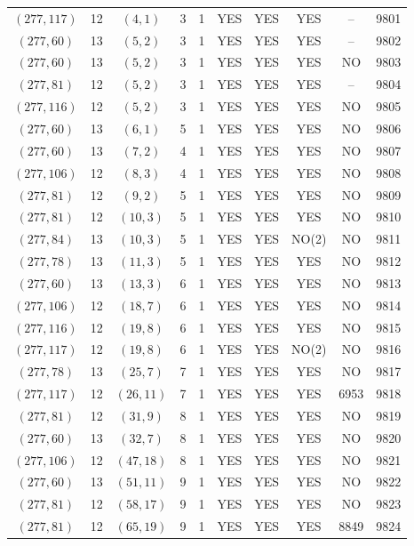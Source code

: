 \begin{longtable}{|c|c|c|c|c|c|c|c|c|c|}
$(277, 117)$ & 12 & $(4, 1)$ & 3 & 1 & YES & YES & YES & -- & 9801\\
$(277, 60)$ & 13 & $(5, 2)$ & 3 & 1 & YES & YES & YES & -- & 9802\\
$(277, 60)$ & 13 & $(5, 2)$ & 3 & 1 & YES & YES & YES & NO & 9803\\
$(277, 81)$ & 12 & $(5, 2)$ & 3 & 1 & YES & YES & YES & -- & 9804\\
$(277, 116)$ & 12 & $(5, 2)$ & 3 & 1 & YES & YES & YES & NO & 9805\\
$(277, 60)$ & 13 & $(6, 1)$ & 5 & 1 & YES & YES & YES & NO & 9806\\
$(277, 60)$ & 13 & $(7, 2)$ & 4 & 1 & YES & YES & YES & NO & 9807\\
$(277, 106)$ & 12 & $(8, 3)$ & 4 & 1 & YES & YES & YES & NO & 9808\\
$(277, 81)$ & 12 & $(9, 2)$ & 5 & 1 & YES & YES & YES & NO & 9809\\
$(277, 81)$ & 12 & $(10, 3)$ & 5 & 1 & YES & YES & YES & NO & 9810\\
$(277, 84)$ & 13 & $(10, 3)$ & 5 & 1 & YES & YES & NO(2) & NO & 9811\\
$(277, 78)$ & 13 & $(11, 3)$ & 5 & 1 & YES & YES & YES & NO & 9812\\
$(277, 60)$ & 13 & $(13, 3)$ & 6 & 1 & YES & YES & YES & NO & 9813\\
$(277, 106)$ & 12 & $(18, 7)$ & 6 & 1 & YES & YES & YES & NO & 9814\\
$(277, 116)$ & 12 & $(19, 8)$ & 6 & 1 & YES & YES & YES & NO & 9815\\
$(277, 117)$ & 12 & $(19, 8)$ & 6 & 1 & YES & YES & NO(2) & NO & 9816\\
$(277, 78)$ & 13 & $(25, 7)$ & 7 & 1 & YES & YES & YES & NO & 9817\\
$(277, 117)$ & 12 & $(26, 11)$ & 7 & 1 & YES & YES & YES & 6953 & 9818\\
$(277, 81)$ & 12 & $(31, 9)$ & 8 & 1 & YES & YES & YES & NO & 9819\\
$(277, 60)$ & 13 & $(32, 7)$ & 8 & 1 & YES & YES & YES & NO & 9820\\
$(277, 106)$ & 12 & $(47, 18)$ & 8 & 1 & YES & YES & YES & NO & 9821\\
$(277, 60)$ & 13 & $(51, 11)$ & 9 & 1 & YES & YES & YES & NO & 9822\\
$(277, 81)$ & 12 & $(58, 17)$ & 9 & 1 & YES & YES & YES & NO & 9823\\
$(277, 81)$ & 12 & $(65, 19)$ & 9 & 1 & YES & YES & YES & 8849 & 9824\\

\end{longtable}

